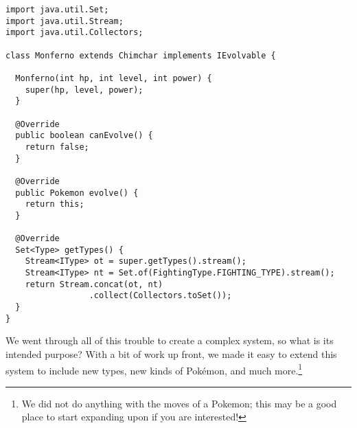 \begin{lstlisting}[language=MyJava]
import java.util.Set;
import java.util.Stream;
import java.util.Collectors;

class Monferno extends Chimchar implements IEvolvable {

  Monferno(int hp, int level, int power) {
    super(hp, level, power);
  }

  @Override 
  public boolean canEvolve() {
    return false;
  }

  @Override
  public Pokemon evolve() {
    return this;
  }

  @Override
  Set<Type> getTypes() {
    Stream<IType> ot = super.getTypes().stream();
    Stream<IType> nt = Set.of(FightingType.FIGHTING_TYPE).stream();
    return Stream.concat(ot, nt)
                 .collect(Collectors.toSet());
  }
}
\end{lstlisting}

We went through all of this trouble to create a complex system, so what is its intended purpose? With a bit of work up front, we made it easy to extend this system to include new types, new kinds of Pok\'emon, and much more.\footnote{We did not do anything with the moves of a Pokemon; this may be a good place to start expanding upon if you are interested!}